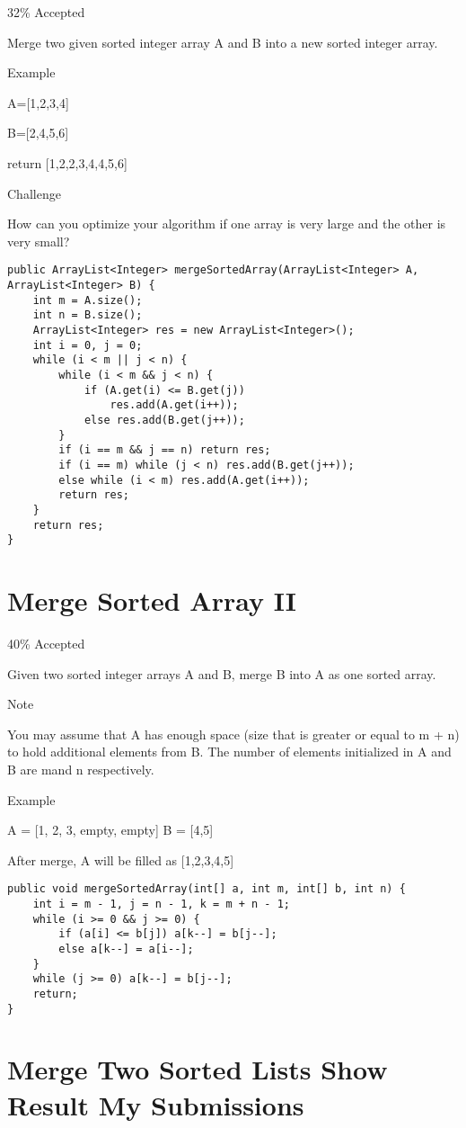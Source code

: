 \documentclass[9pt, b5paaper]{book}
\begin{document}
32\% Accepted

Merge two given sorted integer array A and B into a new sorted integer array.

Example

A=[1,2,3,4]

B=[2,4,5,6]

return [1,2,2,3,4,4,5,6]

Challenge

How can you optimize your algorithm if one array is very large and the other is very small?
\begin{verbatim}
public ArrayList<Integer> mergeSortedArray(ArrayList<Integer> A, ArrayList<Integer> B) {
    int m = A.size();
    int n = B.size();
    ArrayList<Integer> res = new ArrayList<Integer>();
    int i = 0, j = 0;
    while (i < m || j < n) {
        while (i < m && j < n) {
            if (A.get(i) <= B.get(j)) 
                res.add(A.get(i++));
            else res.add(B.get(j++));
        }
        if (i == m && j == n) return res;
        if (i == m) while (j < n) res.add(B.get(j++));
        else while (i < m) res.add(A.get(i++));
        return res;
    }
    return res;
}
\end{verbatim}
\section{Merge Sorted Array II}
\label{sec-5-44}

40\% Accepted

Given two sorted integer arrays A and B, merge B into A as one sorted array.

Note

You may assume that A has enough space (size that is greater or equal to m + n) to hold additional elements from B. The number of elements initialized in A and B are mand n respectively.

Example

A = [1, 2, 3, empty, empty] B = [4,5]

After merge, A will be filled as [1,2,3,4,5]
\begin{verbatim}
public void mergeSortedArray(int[] a, int m, int[] b, int n) {
    int i = m - 1, j = n - 1, k = m + n - 1;
    while (i >= 0 && j >= 0) {
        if (a[i] <= b[j]) a[k--] = b[j--];
        else a[k--] = a[i--];
    }
    while (j >= 0) a[k--] = b[j--];
    return;
}
\end{verbatim}
\section{Merge Two Sorted Lists Show Result My Submissions}
\label{sec-5-45}
\end{document}
